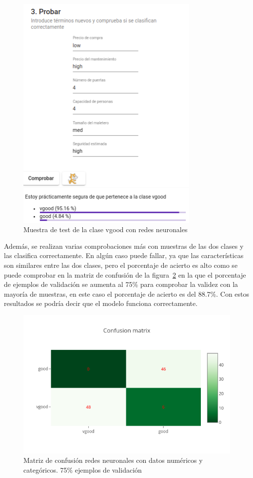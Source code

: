 \documentclass[a4paper, 12pt]{book}
\begin{document}
\begin{figure}
	\centering
	\includegraphics[width=9cm, keepaspectratio]{img/vgood_rn.png}
	\caption{Muestra de test de la clase vgood con redes neuronales} 	
	\label{fig:ejemplo21}
\end{figure}

Además, se realizan varias comprobaciones más con muestras de las dos clases y las clasifica correctamente. 
En algún caso puede fallar, ya que las características son similares entre las dos clases, pero el porcentaje de acierto es alto como se puede comprobar en la matriz de confusión de la figura~\ref{fig:ejemplo22} en la que el porcentaje de ejemplos de validación se aumenta al 75\% para comprobar la validez con la mayoría de muestras, en este caso el porcentaje de acierto es del 88.7\%. Con estos resultados se podría decir que el modelo funciona correctamente.

\begin{figure}
	\centering
	\includegraphics[width=12cm, keepaspectratio]{img/cm_numycat_rn2.png}
	\caption{Matriz de confusión redes neuronales con datos numéricos y categóricos. 75\% ejemplos de validación} 	
	\label{fig:ejemplo22}
\end{figure}
\end{document}
